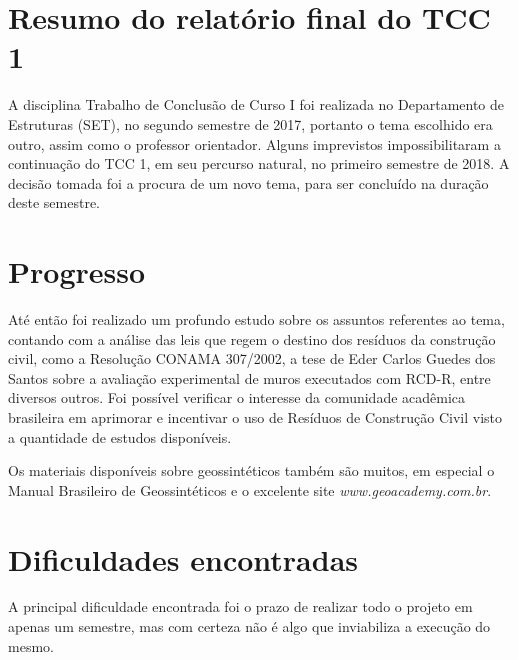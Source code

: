 \section{Resumo do relatório final do TCC 1}
A disciplina Trabalho de Conclusão de Curso I foi realizada no Departamento de Estruturas (SET), no segundo semestre de 2017, portanto o tema escolhido era outro, assim como o professor orientador. Alguns imprevistos impossibilitaram a continuação do TCC 1, em seu percurso natural, no primeiro semestre de 2018. A decisão tomada foi a procura de um novo tema, para ser concluído na duração deste semestre.

\section{Progresso}
Até então foi realizado um profundo estudo sobre os assuntos referentes ao tema, contando com a análise das leis que regem o destino dos resíduos da construção civil, como a Resolução CONAMA 307/2002, a tese de Eder Carlos Guedes dos Santos sobre a avaliação experimental de muros executados com RCD-R, entre diversos outros. Foi possível verificar o interesse da comunidade acadêmica brasileira em aprimorar e incentivar o uso de Resíduos de Construção Civil visto a quantidade de estudos disponíveis.

Os materiais disponíveis sobre geossintéticos também são muitos, em especial o Manual Brasileiro de Geossintéticos e o excelente site \textit{www.geoacademy.com.br}.

\section{Dificuldades encontradas}
A principal dificuldade encontrada foi o prazo de realizar todo o projeto em apenas um semestre, mas com certeza não é algo que inviabiliza a execução do mesmo.